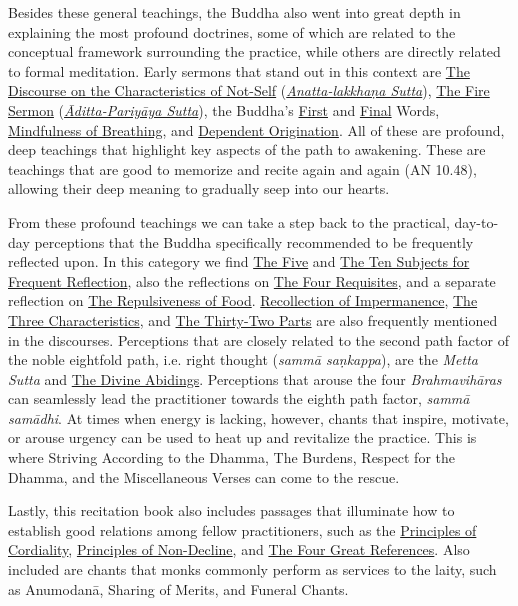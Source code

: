 Besides these general teachings, the Buddha also went into great depth in explaining the most profound doctrines, some of which are related to the conceptual framework surrounding the practice, while others are directly related to formal meditation. Early sermons that stand out in this context are \hyperref[characteristic-of-not-self]{The Discourse on the Characteristics of Not-Self} (\hyperref[anatta-lakkhana]{\textit{Anatta-lakkhaṇa Sutta}}), \hyperref[fire-sermon]{The Fire Sermon} (\hyperref[aditta-pariyaya]{\textit{Āditta-Pariyāya Sutta}}), the Buddha's \hyperref[buddhas-first-exclamation]{First} and \hyperref[buddhas-final-instruction]{Final} Words, \hyperref[mindfulness-of-breathing]{Mindfulness of Breathing}, and \hyperref[dependent-origination]{Dependent Origination}. All of these are profound, deep teachings that highlight key aspects of the path to awakening. These are teachings that are good to memorize and recite again and again (AN 10.48), allowing their deep meaning to gradually seep into our hearts.

From these profound teachings we can take a step back to the practical, day-to-day perceptions that the Buddha specifically recommended to be frequently reflected upon. In this category we find \hyperref[five-reflections]{The Five} and \hyperref[ten-reflections]{The Ten Subjects for Frequent Reflection}, also the reflections on \hyperref[four-requisites]{The Four Requisites}, and a separate reflection on \hyperref[repulsiveness-of-food]{The Repulsiveness of Food}. \hyperref[recollection-of-impermanence]{Recollection of Impermanence}, \hyperref[three-characteristics]{The Three Characteristics}, and \hyperref[32-parts]{The Thirty-Two Parts} are also frequently mentioned in the discourses. Perceptions that are closely related to the second path factor of the noble eightfold path, i.e. right thought (\textit{sammā saṇkappa}), are the \textit{Metta Sutta} and \hyperref[divine-abidings]{The Divine Abidings}. Perceptions that arouse the four \textit{Brahmavihāras} can seamlessly lead the practitioner towards the eighth path factor, \textit{sammā samādhi}. At times when energy is lacking, however, chants that inspire, motivate, or arouse urgency can be used to heat up and revitalize the practice. This is where Striving According to the Dhamma, The Burdens, Respect for the Dhamma, and the Miscellaneous Verses can come to the rescue.

Lastly, this recitation book also includes passages that illuminate how to establish good relations among fellow practitioners, such as the \hyperref[principles-of-cordiality]{Principles of Cordiality}, \hyperref[principles-of-non-decline]{Principles of Non-Decline}, and \hyperref[four-great-references]{The Four Great References}. Also included are chants that monks commonly perform as services to the laity, such as Anumodanā, Sharing of Merits, and Funeral Chants.

